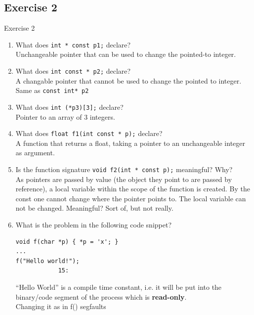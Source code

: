 \documentclass[10pt]{beamer}
\begin{document}
\subsection*{Exercise 2}
\frame{\subsectionpage}
\begin{frame}{Exercise 2}
    	\begin{enumerate}
		\item What does \texttt{int * const p1;} declare? \\ \vspace{0.3cm}
		\alert{Unchangeable pointer that can be used to change the pointed-to integer.}
		
		\item What does \texttt{int const * p2;} declare? \\ \vspace{0.3cm}
			\alert{A changable pointer that cannot be used to change the pointed to integer.\\
			Same as \texttt{const int* p2}}
			
		\item What does \texttt{int (*p3)[3];} declare?\\ \vspace{0.3cm}
		\alert{Pointer to an array of 3 integers.}
		
		\item What does \texttt{float f1(int const * p);} declare? \\ \vspace{0.3cm}
		\alert{A function that returns a float, taking a pointer to an unchangeable integer as argument.}
		
		\item Is the function signature \texttt{void f2(int * const p);} meaningful? Why? \\ \vspace{0.3cm}
		\alert{As pointers are passed by value (the object they point to are passed by reference), a local variable within the scope of the function is created. By the const one cannot change where the pointer points to. The local variable can not be changed. Meaningful? Sort of, but not really.}
		
		\item%
			What is the problem in the following code snippet?
			\begin{verbatim}
void f(char *p) { *p = 'x'; }
...
f("Hello world!");
            15:\end{verbatim} 
			\alert{``Hello World'' is a compile time constant, i.e. it will be put into the binary/code segment of the process which is \textbf{read-only}. \\
			Changing it as in f() segfaults}
			

\end{enumerate}
\end{frame}
\end{document}

